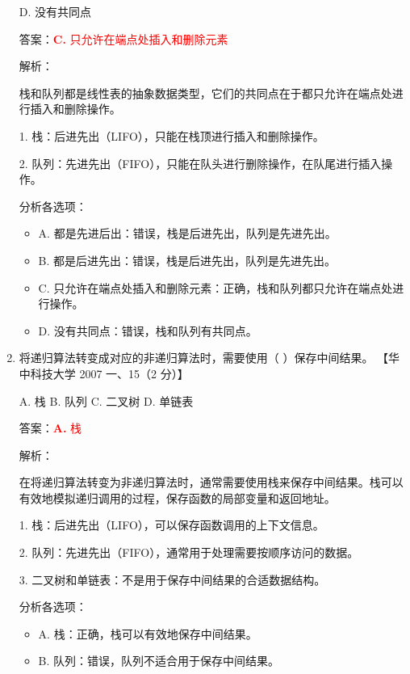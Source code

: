 \documentclass[lang=cn,newtx,10pt,scheme=chinese]{../../../elegantbook}
\begin{document}
\begin{enumerate}
    D. 没有共同点  

    答案：\textcolor{red}{\textbf{C.} 只允许在端点处插入和删除元素}

    解析：

    栈和队列都是线性表的抽象数据类型，它们的共同点在于都只允许在端点处进行插入和删除操作。

    1. 栈：后进先出（LIFO），只能在栈顶进行插入和删除操作。

    2. 队列：先进先出（FIFO），只能在队头进行删除操作，在队尾进行插入操作。

    分析各选项：
    \begin{itemize}
        \item A. 都是先进后出：错误，栈是后进先出，队列是先进先出。
        
        \item B. 都是后进先出：错误，栈是后进先出，队列是先进先出。
        
        \item C. 只允许在端点处插入和删除元素：正确，栈和队列都只允许在端点处进行操作。
        
        \item D. 没有共同点：错误，栈和队列有共同点。
    \end{itemize}

    \item 将递归算法转变成对应的非递归算法时，需要使用（ ）保存中间结果。  
    【华中科技大学 2007 一、15（2 分）】  

    A. 栈 \quad B. 队列 \quad C. 二叉树 \quad D. 单链表  

    答案：\textcolor{red}{\textbf{A.} 栈}

    解析：

    在将递归算法转变为非递归算法时，通常需要使用栈来保存中间结果。栈可以有效地模拟递归调用的过程，保存函数的局部变量和返回地址。

    1. 栈：后进先出（LIFO），可以保存函数调用的上下文信息。

    2. 队列：先进先出（FIFO），通常用于处理需要按顺序访问的数据。

    3. 二叉树和单链表：不是用于保存中间结果的合适数据结构。

    分析各选项：
    \begin{itemize}
        \item A. 栈：正确，栈可以有效地保存中间结果。
        
        \item B. 队列：错误，队列不适合用于保存中间结果。
        

\end{itemize}
\end{enumerate}
\end{document}
